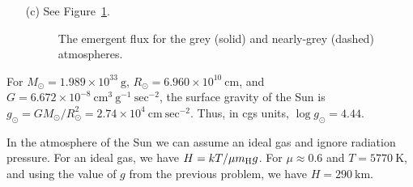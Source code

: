 \begin{problem}
\begin{enumerate}
\item[(c)]
See Figure~\ref{figure-problem-nearly-grey-continuum}.

\begin{figure}
\footnotesize
{}
\caption{The emergent flux for the grey (solid) and nearly-grey (dashed) atmospheres.}
\label{figure-problem-nearly-grey-continuum}
\end{figure}

\end{enumerate}
\end{problem}

\clearpage

\problemset

\begin{problem}
For $M_\odot = 1.989 \times 10^{33}~\mathrm{g}$, $R_\odot = 6.960 \times 10^{10}~\mathrm{cm}$, and $G = 6.672 \times 10^{-8}~\mathrm{cm^3~g^{-1}~sec^{-2}}$, the surface gravity of the Sun is $g_\odot = GM_\odot/R_\odot^2 = 2.74 \times 10^{4}~\mathrm{cm~sec^{-2}}$. Thus, in cgs units, $\log g_\odot = 4.44$.
\end{problem}

\begin{problem}
In the atmosphere of the Sun we can assume an ideal gas and ignore radiation pressure. For an ideal gas, we have $H = kT/\mu m_\mathrm{H} g$. For $\mu \approx 0.6$ and $T =  5770~\mathrm{K}$, and using the value of $g$ from the previous problem, we have $H = 290~\mathrm{km}$.
\end{problem}

